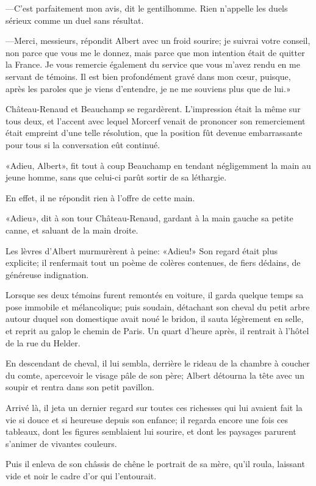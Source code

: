 —C'est parfaitement mon avis, dit le gentilhomme. Rien n'appelle les duels sérieux comme un duel sans résultat. 

—Merci, messieurs, répondit Albert avec un froid sourire; je suivrai votre conseil, non parce que vous me le donnez, mais parce que mon intention était de quitter la France. Je vous remercie également du service que vous m'avez rendu en me servant de témoins. Il est bien profondément gravé dans mon cœur, puisque, après les paroles que je viens d'entendre, je ne me souviens plus que de lui.» 

Château-Renaud et Beauchamp se regardèrent. L'impression était la même sur tous deux, et l'accent avec lequel Morcerf venait de prononcer son remerciement était empreint d'une telle résolution, que la position fût devenue embarrassante pour tous si la conversation eût continué. 

«Adieu, Albert», fit tout à coup Beauchamp en tendant négligemment la main au jeune homme, sans que celui-ci parût sortir de sa léthargie. 

En effet, il ne répondit rien à l'offre de cette main. 

«Adieu», dit à son tour Château-Renaud, gardant à la main gauche sa petite canne, et saluant de la main droite. 

Les lèvres d'Albert murmurèrent à peine: «Adieu!» Son regard était plus explicite; il renfermait tout un poème de colères contenues, de fiers dédains, de généreuse indignation. 

Lorsque ses deux témoins furent remontés en voiture, il garda quelque temps sa pose immobile et mélancolique; puis soudain, détachant son cheval du petit arbre autour duquel son domestique avait noué le bridon, il sauta légèrement en selle, et reprit au galop le chemin de Paris. Un quart d'heure après, il rentrait à l'hôtel de la rue du Helder. 

En descendant de cheval, il lui sembla, derrière le rideau de la chambre à coucher du comte, apercevoir le visage pâle de son père; Albert détourna la tête avec un soupir et rentra dans son petit pavillon. 

Arrivé là, il jeta un dernier regard sur toutes ces richesses qui lui avaient fait la vie si douce et si heureuse depuis son enfance; il regarda encore une fois ces tableaux, dont les figures semblaient lui sourire, et dont les paysages parurent s'animer de vivantes couleurs. 

Puis il enleva de son châssis de chêne le portrait de sa mère, qu'il roula, laissant vide et noir le cadre d'or qui l'entourait. 

